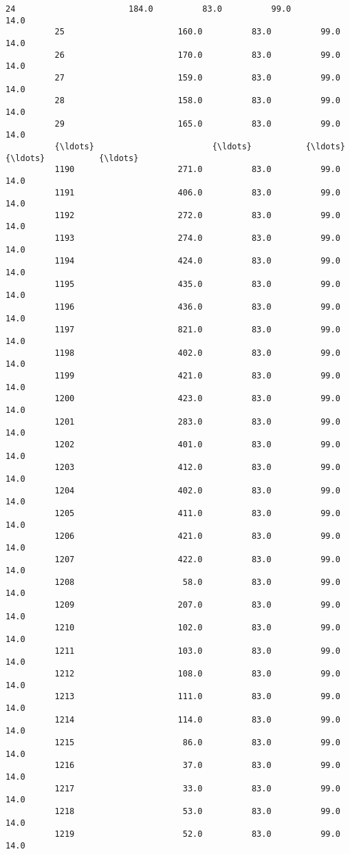 \documentclass[11pt]{article}
\begin{document}
\begin{Verbatim}[commandchars=\\\{\}]
          24                       184.0          83.0          99.0          14.0   
          25                       160.0          83.0          99.0          14.0   
          26                       170.0          83.0          99.0          14.0   
          27                       159.0          83.0          99.0          14.0   
          28                       158.0          83.0          99.0          14.0   
          29                       165.0          83.0          99.0          14.0   
          {\ldots}                        {\ldots}           {\ldots}           {\ldots}           {\ldots}   
          1190                     271.0          83.0          99.0          14.0   
          1191                     406.0          83.0          99.0          14.0   
          1192                     272.0          83.0          99.0          14.0   
          1193                     274.0          83.0          99.0          14.0   
          1194                     424.0          83.0          99.0          14.0   
          1195                     435.0          83.0          99.0          14.0   
          1196                     436.0          83.0          99.0          14.0   
          1197                     821.0          83.0          99.0          14.0   
          1198                     402.0          83.0          99.0          14.0   
          1199                     421.0          83.0          99.0          14.0   
          1200                     423.0          83.0          99.0          14.0   
          1201                     283.0          83.0          99.0          14.0   
          1202                     401.0          83.0          99.0          14.0   
          1203                     412.0          83.0          99.0          14.0   
          1204                     402.0          83.0          99.0          14.0   
          1205                     411.0          83.0          99.0          14.0   
          1206                     421.0          83.0          99.0          14.0   
          1207                     422.0          83.0          99.0          14.0   
          1208                      58.0          83.0          99.0          14.0   
          1209                     207.0          83.0          99.0          14.0   
          1210                     102.0          83.0          99.0          14.0   
          1211                     103.0          83.0          99.0          14.0   
          1212                     108.0          83.0          99.0          14.0   
          1213                     111.0          83.0          99.0          14.0   
          1214                     114.0          83.0          99.0          14.0   
          1215                      86.0          83.0          99.0          14.0   
          1216                      37.0          83.0          99.0          14.0   
          1217                      33.0          83.0          99.0          14.0   
          1218                      53.0          83.0          99.0          14.0   
          1219                      52.0          83.0          99.0          14.0   
          

\end{Verbatim}
\end{document}
